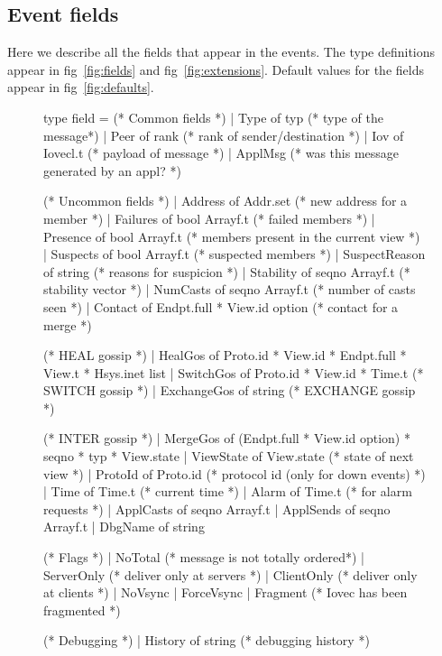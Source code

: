 \subsection{Event fields}
Here we describe all the fields that appear in the events. The
type definitions appear in fig~\ref{fig:fields} and
fig~\ref{fig:extensions}.  Default values for the fields appear in
fig~\ref{fig:defaults}.

\begin{figure}
\begin{codebox}
type field =
      (* Common fields *)
  | Type        of typ            (* type of the message*)
  | Peer        of rank           (* rank of sender/destination *)
  | Iov	        of Iovecl.t       (* payload of message *)
  | ApplMsg                       (* was this message generated by an appl? *)

      (* Uncommon fields *)
  | Address     of Addr.set	  (* new address for a member *)
  | Failures    of bool Arrayf.t  (* failed members *)
  | Presence    of bool Arrayf.t  (* members present in the current view *)
  | Suspects    of bool Arrayf.t  (* suspected members *)
  | SuspectReason of string	  (* reasons for suspicion *)
  | Stability   of seqno Arrayf.t (* stability vector *)
  | NumCasts    of seqno Arrayf.t (* number of casts seen *)
  | Contact     of Endpt.full * View.id option (* contact for a merge *)

      (* HEAL gossip *)  
  | HealGos     of Proto.id * View.id * Endpt.full * View.t * Hsys.inet list
  | SwitchGos   of Proto.id * View.id * Time.t  (* SWITCH gossip *)
  | ExchangeGos	of string		(* EXCHANGE gossip *)

      (* INTER gossip *)
  | MergeGos    of (Endpt.full * View.id option) * seqno * typ * View.state
  | ViewState   of View.state	(* state of next view *)
  | ProtoId     of Proto.id	(* protocol id (only for down events) *)
  | Time        of Time.t	(* current time *)
  | Alarm       of Time.t	(* for alarm requests *)
  | ApplCasts   of seqno Arrayf.t
  | ApplSends   of seqno Arrayf.t
  | DbgName     of string

      (* Flags *)
  | NoTotal                     (* message is not totally ordered*)
  | ServerOnly	                (* deliver only at servers *)
  | ClientOnly	                (* deliver only at clients *)
  | NoVsync
  | ForceVsync
  | Fragment	                (* Iovec has been fragmented *)

      (* Debugging *)
  | History     of string       (* debugging history *)


\end{codebox}
\end{figure}
